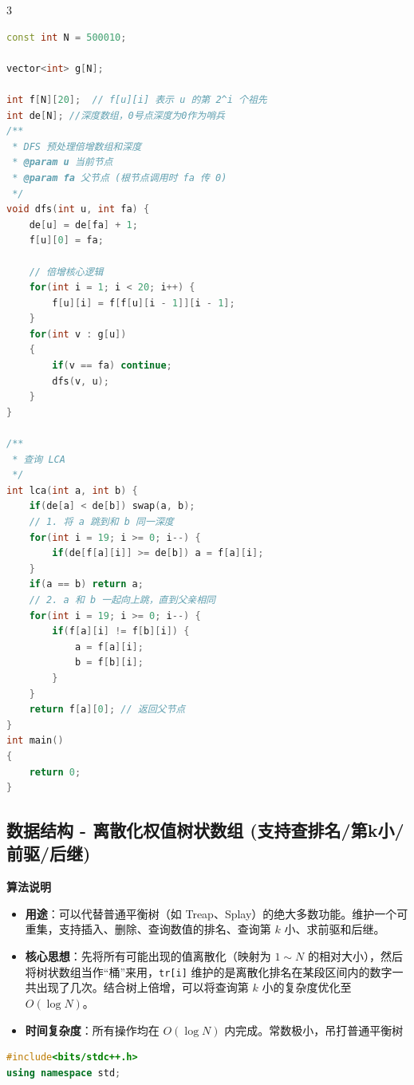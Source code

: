 \documentclass[10pt,landscape,a4paper]{article}
\begin{document}
\begin{multicols*}{3}
\begin{lstlisting}[language=C++]
const int N = 500010;

vector<int> g[N];

int f[N][20];  // f[u][i] 表示 u 的第 2^i 个祖先
int de[N]; //深度数组，0号点深度为0作为哨兵
/**
 * DFS 预处理倍增数组和深度
 * @param u 当前节点
 * @param fa 父节点 (根节点调用时 fa 传 0)
 */
void dfs(int u, int fa) {
    de[u] = de[fa] + 1;
    f[u][0] = fa;

    // 倍增核心逻辑
    for(int i = 1; i < 20; i++) {
        f[u][i] = f[f[u][i - 1]][i - 1];
    }
    for(int v : g[u])
    {
        if(v == fa) continue;
        dfs(v, u);
    }
}

/**
 * 查询 LCA
 */
int lca(int a, int b) {
    if(de[a] < de[b]) swap(a, b);
    // 1. 将 a 跳到和 b 同一深度
    for(int i = 19; i >= 0; i--) {
        if(de[f[a][i]] >= de[b]) a = f[a][i];
    }
    if(a == b) return a;
    // 2. a 和 b 一起向上跳，直到父亲相同
    for(int i = 19; i >= 0; i--) {
        if(f[a][i] != f[b][i]) {
            a = f[a][i];
            b = f[b][i];
        }
    }
    return f[a][0]; // 返回父节点
}
int main()
{
    return 0;
}
\end{lstlisting}
\subsection*{数据结构 - 离散化权值树状数组 (支持查排名/第k小/前驱/后继)}
\par\addvspace{0.7ex}\noindent\textbf{算法说明}\par\nobreak
\begin{itemize}
\item \textbf{用途}：可以代替普通平衡树（如 Treap、Splay）的绝大多数功能。维护一个可重集，支持插入、删除、查询数值的排名、查询第 $k$ 小、求前驱和后继。
\item \textbf{核心思想}：先将所有可能出现的值离散化（映射为 $1 \sim N$ 的相对大小），然后将树状数组当作“桶”来用，\texttt{t\allowbreak{}r\allowbreak{}[\allowbreak{}i\allowbreak{}]} 维护的是离散化排名在某段区间内的数字一共出现了几次。结合树上倍增，可以将查询第 $k$ 小的复杂度优化至 $O(\log N)$。
\item \textbf{时间复杂度}：所有操作均在 $O(\log N)$ 内完成。常数极小，吊打普通平衡树
\end{itemize}
\par{}\par
\begin{lstlisting}[language=C++]
#include<bits/stdc++.h>
using namespace std;


\end{lstlisting}
\end{multicols*}
\end{document}
